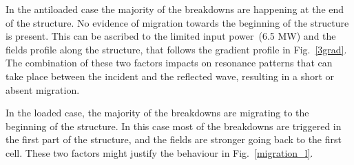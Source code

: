 In the antiloaded case the majority of the breakdowns are happening at the end of the structure. No evidence of migration towards the beginning of the structure is present. This can be ascribed to the limited input power~(6.5 MW) and the fields profile along the structure, that follows the gradient profile in Fig.~\ref{3grad}. 
The combination of these two factors impacts on resonance patterns that can take place between the incident and the reflected wave, resulting in a short or absent migration.

In the loaded case, the majority of the breakdowns are migrating to the beginning of the structure. In this case most of the breakdowns are triggered in the first part of the structure, and the fields are stronger going back to the first cell. These two factors might justify the behaviour in Fig.~\ref{migration_l}.

